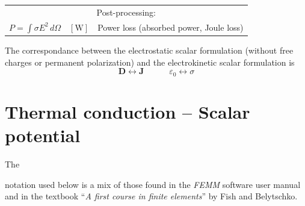 \documentclass[letterpaper]{article}
\newcommand{\vect}[1]{\mathbf#1}
\begin{document}
\begin{table}[h!]
\begin{tabular}{lll}
\hline
\multicolumn{3}{c}{Post-processing:} \\
$P=\int\sigma E^2\,d\Omega$ & $[\text{W}]$ & Power loss (absorbed power, Joule loss)\\[1pt]

 
\hline
\end{tabular}
\end{table}

The correspondance between the electrostatic scalar formulation (without free charges or permanent polarization) and the electrokinetic scalar formulation is  
\begin{equation}
\vect{D}\leftrightarrow\vect{J}\qquad\quad
\varepsilon_0\leftrightarrow\sigma
\end{equation}





\clearpage
\section{Thermal conduction -- Scalar potential}
\label{sec_tsp}

\hypertarget{sec_tsp}{The} notation used below is a mix of those found in the \textit{FEMM} software user manual and in the textbook ``\textit{A first course in finite elements}'' by Fish and Belytschko. %
\end{document}
